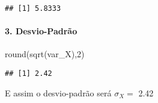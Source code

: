 \documentclass[
]{article}
\newenvironment{Shaded}{\begin{snugshade}}{\end{snugshade}}
\newcommand{\DecValTok}[1]{\textcolor[rgb]{0.00,0.00,0.81}{#1}}
\newcommand{\FunctionTok}[1]{\textcolor[rgb]{0.00,0.00,0.00}{#1}}
\newcommand{\NormalTok}[1]{#1}
\begin{document}
\begin{verbatim}
## [1] 5.8333
\end{verbatim}

\hypertarget{desvio-padruxe3o}{%
\paragraph{3. Desvio-Padrão}\label{desvio-padruxe3o}}

\begin{Shaded}
\begin{Highlighting}[]
\FunctionTok{round}\NormalTok{(}\FunctionTok{sqrt}\NormalTok{(var\_X),}\DecValTok{2}\NormalTok{)}
\end{Highlighting}
\end{Shaded}

\begin{verbatim}
## [1] 2.42
\end{verbatim}

E assim o desvio-padrão será \({\sigma}_{X}=\) 2.42
\end{document}
